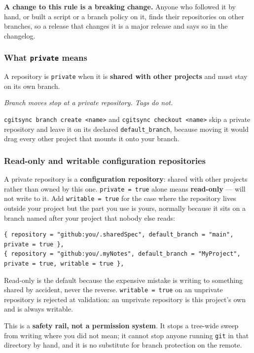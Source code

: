 \textbf{A change to this rule is a breaking change.} Anyone who followed it by
hand, or built a script or a branch policy on it, finds their repositories on
other branches, so a release that changes it is a major release and says so in
the changelog.

\subsubsection{What \texttt{private} means}

A repository is \texttt{private} when it is \textbf{shared with other
projects} and must stay on its own branch.

\begin{center}
\emph{Branch moves stop at a private repository. Tags do not.}
\end{center}

\texttt{cgitsync branch create <name>} and \texttt{cgitsync checkout <name>} skip
a private repository and leave it on its declared
\texttt{default\_branch}, because moving it would drag every other project
that mounts it onto your branch.

\subsubsection{Read-only and writable configuration repositories}

A private repository is a \textbf{configuration repository}: shared with
other projects rather than owned by this one. \texttt{private = true} alone
means \textbf{read-only} --- \cgscli{} will not write to it. Add
\texttt{writable = true} for the case where the repository lives outside
your project but the part you use is yours, normally because it sits on a
branch named after your project that nobody else reads:

\begin{lstlisting}
{ repository = "github:you/.sharedSpec", default_branch = "main", private = true },
{ repository = "github:you/.myNotes", default_branch = "MyProject", private = true, writable = true },
\end{lstlisting}

Read-only is the default because the expensive mistake is writing to
something shared by accident, never the reverse. \texttt{writable = true}
on an unprivate repository is rejected at validation: an unprivate repository
is this project's own and is always writable.

This is a \textbf{safety rail, not a permission system}. It stops a
tree-wide sweep from writing where you did not mean; it cannot stop anyone
running \texttt{git} in that directory by hand, and it is no substitute
for branch protection on the remote.

